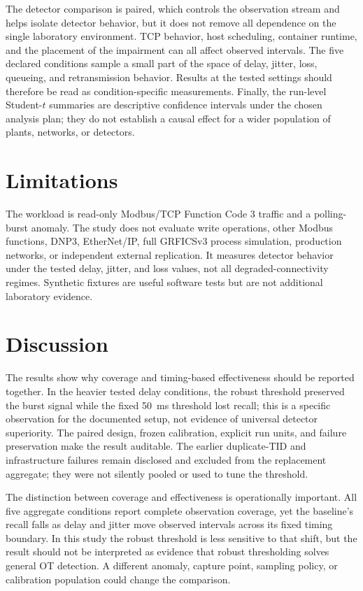 \documentclass[11pt]{article}
\newcommand{\fc}{Modbus/TCP Function Code 3}
\begin{document}
The detector comparison is paired, which controls the observation stream and
helps isolate detector behavior, but it does not remove all dependence on the
single laboratory environment. TCP behavior, host scheduling, container
runtime, and the placement of the impairment can all affect observed intervals.
The five declared conditions sample a small part of the space of delay, jitter,
loss, queueing, and retransmission behavior. Results at the tested settings
should therefore be read as condition-specific measurements. Finally, the
run-level Student-$t$ summaries are descriptive confidence intervals under the
chosen analysis plan; they do not establish a causal effect for a wider
population of plants, networks, or detectors.

\section{Limitations}
The workload is read-only \fc{} traffic and a polling-burst anomaly. The study
does not evaluate write operations, other Modbus functions, DNP3, EtherNet/IP,
full GRFICSv3 process simulation, production networks, or independent external
replication. It measures detector behavior under the tested delay, jitter, and
loss values, not all degraded-connectivity regimes. Synthetic fixtures are
useful software tests but are not additional laboratory evidence.

\section{Discussion}
The results show why coverage and timing-based effectiveness should be reported
together. In the heavier tested delay conditions, the robust threshold preserved
the burst signal while the fixed 50~ms threshold lost recall; this is a specific
observation for the documented setup, not evidence of universal detector
superiority. The paired design, frozen calibration, explicit run units, and
failure preservation make the result auditable. The earlier duplicate-TID and
infrastructure failures remain disclosed and excluded from the replacement
aggregate; they were not silently pooled or used to tune the threshold.

The distinction between coverage and effectiveness is operationally important.
All five aggregate conditions report complete observation coverage, yet the
baseline's recall falls as delay and jitter move observed intervals across its
fixed timing boundary. In this study the robust threshold is less sensitive to
that shift, but the result should not be interpreted as evidence that robust
thresholding solves general OT detection. A different anomaly, capture point,
sampling policy, or calibration population could change the comparison.
\end{document}
